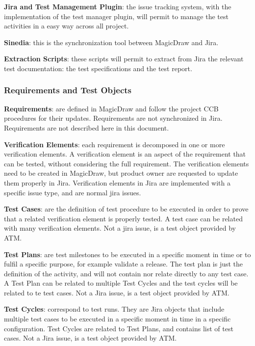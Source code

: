 {\bf Jira and Test Management Plugin}: the issue tracking system, with the implementation of the test manager plugin, will permit to manage the test activities in a easy way across all project.

{\bf Sinedia}: this is the synchronization tool between MagicDraw and Jira.

{\bf Extraction Scripts}: these scripts will permit to extract from Jira the relevant test documentation: the test specifications and the test report.


\subsubsection{Requirements and Test Objects}

{\bf Requirements}: are defined in MagicDraw and follow the project CCB procedures for their updates. Requirements are not synchronized in Jira.
Requirements are not described here in this document.

{\bf Verification Elements}: each requirement is decomposed in one or more verification elements. A verification element is an aspect of the requirement that can be tested, without considering the full requirement. The verification elements need to be created in MagicDraw, but product owner are requested to update them properly in Jira. Verification elements in Jira are implemented with a specific issue type, and are normal jira issues.

{\bf Test Cases}: are the definition of test procedure to be executed in order to prove that a related verification element is properly tested. A test case can be related with many verification elements. Not a jira issue, is a test object provided by ATM.

{\bf Test Plans}: are test milestones to be executed in a specific moment in time or to fulfil a specific purpose, for example validate a release. The test plan is just the definition of the activity, and will not contain nor relate directly to any test case. A Test Plan can be related to multiple Test Cycles and the test cycles will be related to te test cases. Not a Jira issue, is a test object provided by ATM.

{\bf Test Cycles}: correspond to test runs. They are Jira objects that include multiple test cases to be executed in a specific moment in time in a specific configuration. Test Cycles are related to Test Plans, and contains list of test cases. Not a Jira issue, is a test object provided by ATM.

